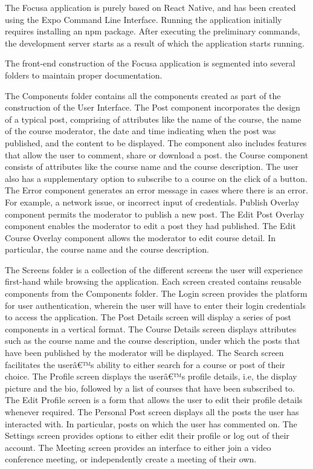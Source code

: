 The Focusa application is purely based on React Native, and has been created using the Expo Command Line Interface. 
Running the application initially requires installing an npm package. After executing the preliminary commands, the development server starts as a result of which the application starts running.

The front-end construction of the Focusa application is segmented into several folders to maintain proper documentation.

The Components folder contains all the components created as part of the construction of the User Interface.
The Post component incorporates the design of a typical post, comprising of attributes like the name of the course, the name of the course moderator, the date and time indicating when the post was published, and the content to be displayed. The component also includes features that allow the user to comment, share or download a post.
the Course component consists of attributes like the course name and the course description. The user also has a supplementary option to subscribe to a course on the click of a button.
The Error component generates an error message in cases where there is an error. For example, a network issue, or incorrect input of credentials.
Publish Overlay component permits the moderator to publish a new post.
The Edit Post Overlay component enables the moderator to edit a post they had published.
The Edit Course Overlay component allows the moderator to edit course detail. In particular, the course name and the course description.

The Screens folder is a collection of the different screens the 
user will experience first-hand while browsing the application. 
Each screen created contains reusable components from the Components folder.
The Login screen provides the platform for user
authentication, wherein the user will have to enter their login
credentials to access the application. 
The Post Details screen will display a series of post components in a vertical format.
The Course Details screen displays attributes such as the course name and the course description, under which the posts that have been published by the moderator will be displayed. 
The Search screen facilitates the userâ€™s ability to either search for a course or post of their choice.
The Profile screen displays the userâ€™s profile details, i.e, the display picture and the bio, followed by a list of courses that have been subscribed to.
The Edit Profile screen is a form that allows the user to
edit their profile details whenever required.
The Personal Post screen displays all the posts the user has 
interacted with. In particular, posts on which the user has commented on.
The Settings screen provides options to either edit their profile or log out of their account.
The Meeting screen provides an interface to either join a video conference meeting, or independently create a meeting of their own.

